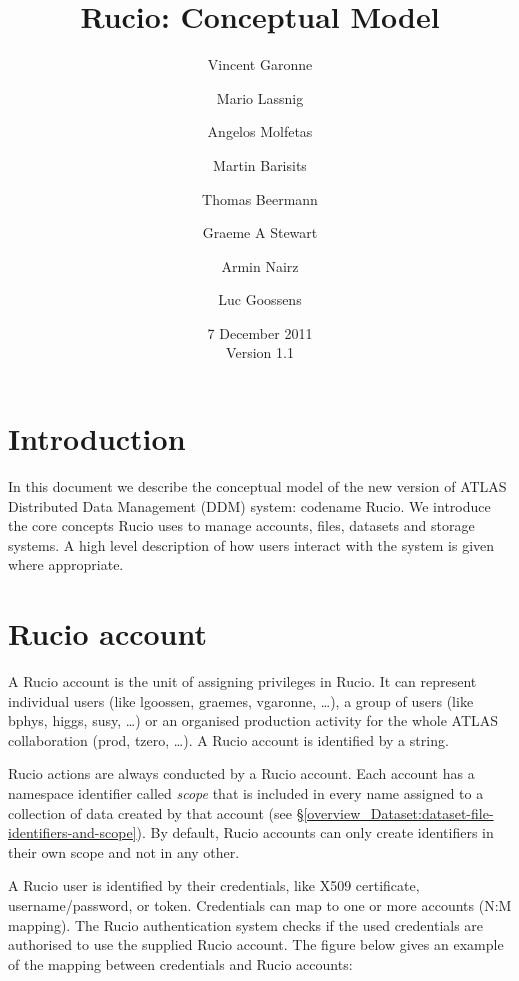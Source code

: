 \documentclass{atlasnote}
\title{Rucio: Conceptual Model}
\author[1]{Vincent Garonne}
\author[1]{Mario Lassnig}
\author[1]{Angelos Molfetas}
\author[1]{Martin Barisits}
\author[1]{Thomas Beermann}
\author[1]{Graeme A Stewart}
\author[1]{Armin Nairz}
\author[1]{Luc Goossens}
\affil[1]{PH-ADP-CO, CERN}
\date{7 December 2011\\ Version 1.1}
\begin{document}
% 

\section{Introduction}


In this document we describe the conceptual model of the new version
of ATLAS Distributed Data Management (DDM) system: codename Rucio.
We introduce the core concepts Rucio uses to manage accounts, files,
datasets and storage systems. A high level description of how users
interact with the system is given where appropriate.

\section{Rucio account}
\label{overview_Rucio_account::doc}\label{overview_Rucio_account:rucio-account}

A Rucio account is the unit of assigning privileges in Rucio. It can
represent individual users (like \mbox{lgoossen}, graemes, vgaronne, \dots), a
group of users (like bphys, higgs, susy, \dots) or an organised
production activity for the whole ATLAS collaboration (prod,
tzero, \dots). A Rucio account is identified by a string.

Rucio actions are always conducted by a Rucio account. Each account
has a namespace identifier called \emph{scope} that is included in every
name assigned to a collection of data created by that account (see
\S\ref{overview_Dataset:dataset-file-identifiers-and-scope}). By default, Rucio accounts can only create identifiers
in their own scope and not in any other.

A Rucio user is identified by their credentials, like X509 certificate,
username/password, or token. Credentials can map to one or more
accounts (N:M mapping). The Rucio authentication system checks if the
used credentials are authorised to use the supplied Rucio account.
The figure below gives an example of the mapping between credentials
and Rucio accounts:
\end{document}
